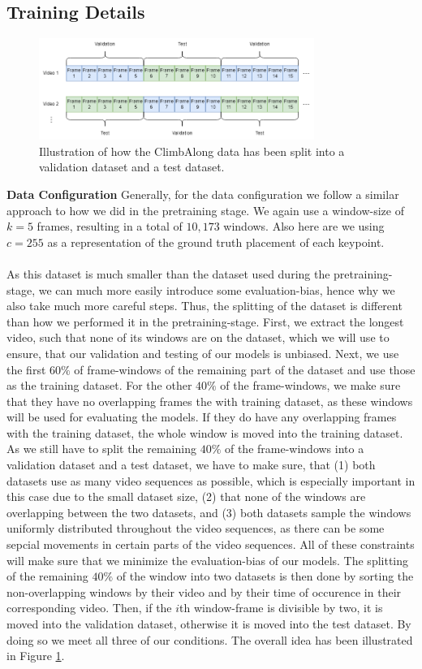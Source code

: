 \documentclass[./main.tex]{subfiles}
\begin{document}
\subsection{Training Details}
\label{sec:pretrain_details}
\begin{figure}[htbp]
    \centering
    \includegraphics[width=0.8\textwidth]{entities/CA_splitting.png}
    \caption{Illustration of how the ClimbAlong data has been split into a validation dataset and a test dataset.}
    \label{fig:CA_splitting}
\end{figure}
\noindent \textbf{Data Configuration} Generally, for the data configuration we follow a similar approach to how we did in the pretraining stage. We again use a window-size of $k = 5$ frames, resulting in a total of $10,173$ windows. Also here are we using $c = 255$ as a representation of the ground truth placement of each keypoint. 
\\
\\
As this dataset is much smaller than the dataset used during the pretraining-stage, we can much more easily introduce some evaluation-bias, hence why we also take much more careful steps. Thus, the splitting of the dataset is different than how we performed it in the pretraining-stage. First, we extract the longest video, such that none of its windows are on the dataset, which we will use to ensure, that our validation and testing of our models is unbiased. Next, we use the first $60\%$ of frame-windows of the remaining part of the dataset and use those as the training dataset. For the other $40\%$ of the frame-windows, we make sure that they have no overlapping frames the with training dataset, as these windows will be used for evaluating the models. If they do have any overlapping frames with the training dataset, the whole window is moved into the training dataset. As we still have to split the remaining $40\%$ of the frame-windows into a validation dataset and a test dataset, we have to make sure, that (1) both datasets use as many video sequences as possible, which is especially important in this case due to the small dataset size, (2) that none of the windows are overlapping between the two datasets, and (3) both datasets sample the windows uniformly distributed throughout the video sequences, as there can be some sepcial movements in certain parts of the video sequences. All of these constraints will make sure that we minimize the evaluation-bias of our models. The splitting of the remaining $40\%$ of the window into two datasets is then done by sorting the non-overlapping windows by their video and by their time of occurence in their corresponding video. Then, if the $i$th window-frame is divisible by two, it is moved into the validation dataset, otherwise it is moved into the test dataset. By doing so we meet all three of our conditions. The overall idea has been illustrated in Figure \ref{fig:CA_splitting}.
\end{document}
